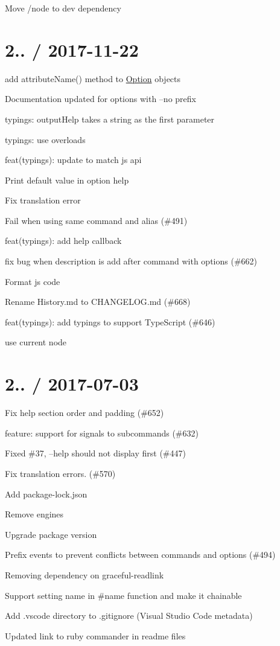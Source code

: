 \begin{DoxyItemize}
\item Move /node to dev dependency
\end{DoxyItemize}

\section*{2.. / 2017-\/11-\/22 }


\begin{DoxyItemize}
\item add attribute\+Name() method to \mbox{\hyperlink{structOption}{Option}} objects
\item Documentation updated for options with --no prefix
\item typings\+: {\ttfamily output\+Help} takes a string as the first parameter
\item typings\+: use overloads
\item feat(typings)\+: update to match js api
\item Print default value in option help
\item Fix translation error
\item Fail when using same command and alias (\#491)
\item feat(typings)\+: add help callback
\item fix bug when description is add after command with options (\#662)
\item Format js code
\item Rename History.\+md to C\+H\+A\+N\+G\+E\+L\+O\+G.\+md (\#668)
\item feat(typings)\+: add typings to support Type\+Script (\#646)
\item use current node
\end{DoxyItemize}

\section*{2.. / 2017-\/07-\/03 }


\begin{DoxyItemize}
\item Fix help section order and padding (\#652)
\item feature\+: support for signals to subcommands (\#632)
\item Fixed \#37, --help should not display first (\#447)
\item Fix translation errors. (\#570)
\item Add package-\/lock.\+json
\item Remove engines
\item Upgrade package version
\item Prefix events to prevent conflicts between commands and options (\#494)
\item Removing dependency on graceful-\/readlink
\item Support setting name in \#name function and make it chainable
\item Add .vscode directory to .gitignore (Visual Studio Code metadata)
\item Updated link to ruby commander in readme files
\end{DoxyItemize}

